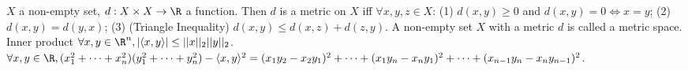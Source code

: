  $X$ a non-empty set, $d: X \times X \to \R$ a function.
Then $d$ is a metric on $X$ iff $\forall x,y,z \in X$:
(1) $d(x,y) \geq 0$ and $d(x,y) = 0 \iff x = y$;
(2) $d(x,y) = d(y,x)$;
(3) (Triangle Inequality) $d(x,y) \leq d(x,z) + d(z,y)$.
A non-empty set $X$ with a metric $d$ is called a metric space.
Inner product
$\forall x,y \in \R^n, |\langle x,y \rangle| \leq ||x||_2 ||y||_2$.
$\forall x,y \in \R, (x_1^2 + \cdots + x_n^2)(y_1^2 + \cdots + y_n^2) - \langle x,y \rangle^2 = (x_1 y_2 - x_2 y_1)^2 + \cdots + (x_1 y_n - x_n y_1)^2 + \cdots + (x_{n-1} y_n - x_n y_{n-1})^2$.
